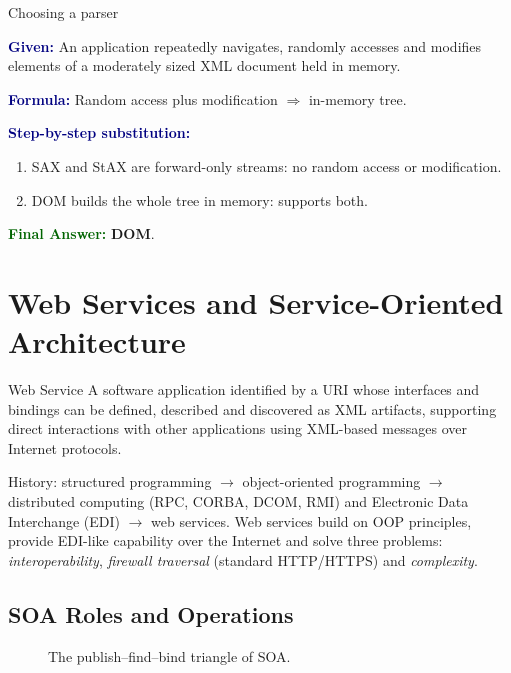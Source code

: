 \documentclass[11pt,a4paper,openany]{report}
\newcommand{\Given}{\par\textbf{\textcolor{navy}{Given:}} }
\newcommand{\Formula}{\par\textbf{\textcolor{navy}{Formula:}} }
\newcommand{\Steps}{\par\textbf{\textcolor{navy}{Step-by-step substitution:}}\par}
\newcommand{\Answer}{\par\textbf{\textcolor{darkgreen}{Final Answer:}} }
\begin{document}
\begin{solved}{Choosing a parser}
\Given An application repeatedly navigates, randomly accesses and modifies elements of a moderately sized XML
document held in memory.
\Formula Random access plus modification $\Rightarrow$ in-memory tree.
\Steps
\begin{enumerate}[leftmargin=*]
  \item SAX and StAX are forward-only streams: no random access or modification.
  \item DOM builds the whole tree in memory: supports both.
\end{enumerate}
\Answer \textbf{DOM}.
\end{solved}

\section{Web Services and Service-Oriented Architecture}
\begin{defbox}{Web Service}
A software application identified by a URI whose interfaces and bindings can be defined, described and
discovered as XML artifacts, supporting direct interactions with other applications using XML-based messages over
Internet protocols.
\end{defbox}
History: structured programming $\rightarrow$ object-oriented programming $\rightarrow$ distributed computing (RPC,
CORBA, DCOM, RMI) and Electronic Data Interchange (EDI) $\rightarrow$ web services. Web services build on OOP
principles, provide EDI-like capability over the Internet and solve three problems: \emph{interoperability},
\emph{firewall traversal} (standard HTTP/HTTPS) and \emph{complexity}.

\subsection{SOA Roles and Operations}
\begin{figure}[H]
\centering
{}
\caption{The publish--find--bind triangle of SOA.}
\end{figure}
\end{document}
